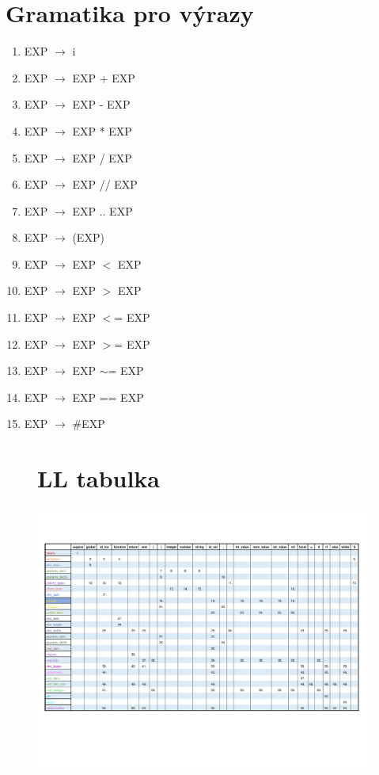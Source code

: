 \documentclass[12pt, letterpaper]{article}
\begin{document}
	\section{Gramatika pro výrazy}
	\begin{enumerate}
 \item EXP $\rightarrow$ i
 \item EXP $\rightarrow$ EXP + EXP
 \item EXP $\rightarrow$ EXP - EXP
 \item EXP $\rightarrow$ EXP * EXP
 \item EXP $\rightarrow$ EXP / EXP
 \item EXP $\rightarrow$ EXP // EXP
 \item EXP $\rightarrow$ EXP .. EXP
 \item EXP $\rightarrow$ (EXP)
 \item EXP $\rightarrow$ EXP $<$ EXP
 \item EXP $\rightarrow$ EXP $>$ EXP
 \item EXP $\rightarrow$ EXP $<$= EXP
 \item EXP $\rightarrow$ EXP $>$= EXP
 \item EXP $\rightarrow$ EXP $\sim$= EXP
 \item EXP $\rightarrow$ EXP == EXP
 \item EXP $\rightarrow$ $\#$EXP
 \end{enumerate}
 
  
  \newpage
  

	\begin{figure}
        \section{LL tabulka}
	        \includegraphics[width=\textwidth,height=\textheight,keepaspectratio]{LLTabulka.pdf}
    \end{figure}
    
\end{document}
